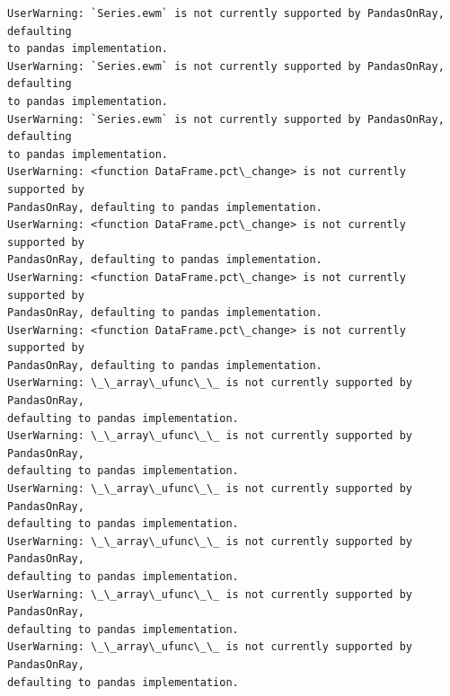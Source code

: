 \documentclass[11pt]{article}
\begin{document}
    \begin{Verbatim}[commandchars=\\\{\}]
UserWarning: `Series.ewm` is not currently supported by PandasOnRay, defaulting
to pandas implementation.
UserWarning: `Series.ewm` is not currently supported by PandasOnRay, defaulting
to pandas implementation.
UserWarning: `Series.ewm` is not currently supported by PandasOnRay, defaulting
to pandas implementation.
UserWarning: <function DataFrame.pct\_change> is not currently supported by
PandasOnRay, defaulting to pandas implementation.
UserWarning: <function DataFrame.pct\_change> is not currently supported by
PandasOnRay, defaulting to pandas implementation.
UserWarning: <function DataFrame.pct\_change> is not currently supported by
PandasOnRay, defaulting to pandas implementation.
UserWarning: <function DataFrame.pct\_change> is not currently supported by
PandasOnRay, defaulting to pandas implementation.
UserWarning: \_\_array\_ufunc\_\_ is not currently supported by PandasOnRay,
defaulting to pandas implementation.
UserWarning: \_\_array\_ufunc\_\_ is not currently supported by PandasOnRay,
defaulting to pandas implementation.
UserWarning: \_\_array\_ufunc\_\_ is not currently supported by PandasOnRay,
defaulting to pandas implementation.
UserWarning: \_\_array\_ufunc\_\_ is not currently supported by PandasOnRay,
defaulting to pandas implementation.
UserWarning: \_\_array\_ufunc\_\_ is not currently supported by PandasOnRay,
defaulting to pandas implementation.
UserWarning: \_\_array\_ufunc\_\_ is not currently supported by PandasOnRay,
defaulting to pandas implementation.
    \end{Verbatim}
\end{document}
